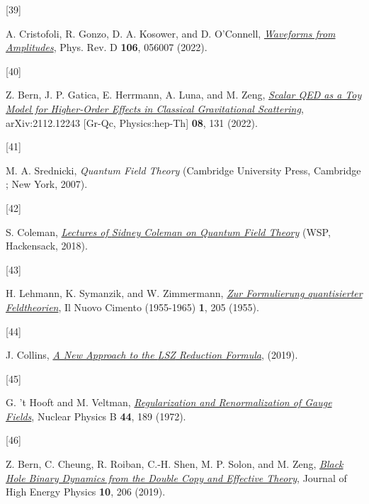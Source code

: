 \documentclass[
  10pt,
  a4paper,
  DIV=11,
  numbers=noendperiod,
  oneside]{scrreprt}
\newlength{\cslhangindent}
\newlength{\csllabelwidth}
\newlength{\cslentryspacingunit} %
\newenvironment{CSLReferences}[2] %
 {%
  \setlength{\parindent}{0pt}
  \ifodd #1
  \let\oldpar\par
  \def\par{\hangindent=\cslhangindent\oldpar}
  \fi
  \setlength{\parskip}{#2\cslentryspacingunit}
 }%
 {}
\newcommand{\CSLLeftMargin}[1]{\parbox[t]{\csllabelwidth}{#1}}
\newcommand{\CSLRightInline}[1]{\parbox[t]{\linewidth - \csllabelwidth}{#1}\break}
\DeclareRobustCommand{\[}{\begin{equation}}
\DeclareRobustCommand{\]}{\end{equation}}
\begin{document}
\begin{CSLReferences}{0}{0}
\leavevmode{}%
\CSLLeftMargin{{[}39{]} }%
\CSLRightInline{A. Cristofoli, R. Gonzo, D. A. Kosower, and D.
O'Connell,
\emph{\href{https://doi.org/10.1103/PhysRevD.106.056007}{Waveforms from
Amplitudes}}, Phys. Rev. D \textbf{106}, 056007 (2022).}

\leavevmode{}%
\CSLLeftMargin{{[}40{]} }%
\CSLRightInline{Z. Bern, J. P. Gatica, E. Herrmann, A. Luna, and M.
Zeng, \emph{\href{https://doi.org/10.1007/JHEP08(2022)131}{Scalar {QED}
as a Toy Model for Higher-Order Effects in Classical Gravitational
Scattering}}, arXiv:2112.12243 {[}Gr-Qc, Physics:hep-Th{]} \textbf{08},
131 (2022).}

\leavevmode{}%
\CSLLeftMargin{{[}41{]} }%
\CSLRightInline{M. A. Srednicki, \emph{Quantum Field Theory} ({Cambridge
University Press}, {Cambridge ; New York}, 2007).}

\leavevmode{}%
\CSLLeftMargin{{[}42{]} }%
\CSLRightInline{S. Coleman,
\emph{\href{https://doi.org/10.1142/9371}{Lectures of {Sidney Coleman}
on {Quantum Field Theory}}} ({WSP}, {Hackensack}, 2018).}

\leavevmode{}%
\CSLLeftMargin{{[}43{]} }%
\CSLRightInline{H. Lehmann, K. Symanzik, and W. Zimmermann,
\emph{\href{https://doi.org/10.1007/BF02731765}{{Zur Formulierung
quantisierter Feldtheorien}}}, Il Nuovo Cimento (1955-1965) \textbf{1},
205 (1955).}

\leavevmode{}%
\CSLLeftMargin{{[}44{]} }%
\CSLRightInline{J. Collins,
\emph{\href{https://arxiv.org/abs/1904.10923}{A New Approach to the
{LSZ} Reduction Formula}}, (2019).}

\leavevmode{}%
\CSLLeftMargin{{[}45{]} }%
\CSLRightInline{G. 't Hooft and M. Veltman,
\emph{\href{https://doi.org/10.1016/0550-3213(72)90279-9}{Regularization
and Renormalization of Gauge Fields}}, Nuclear Physics B \textbf{44},
189 (1972).}

\leavevmode{}%
\CSLLeftMargin{{[}46{]} }%
\CSLRightInline{Z. Bern, C. Cheung, R. Roiban, C.-H. Shen, M. P. Solon,
and M. Zeng, \emph{\href{https://doi.org/10.1007/JHEP10(2019)206}{Black
Hole Binary Dynamics from the Double Copy and Effective Theory}},
Journal of High Energy Physics \textbf{10}, 206 (2019).}


\end{CSLReferences}
\end{document}
